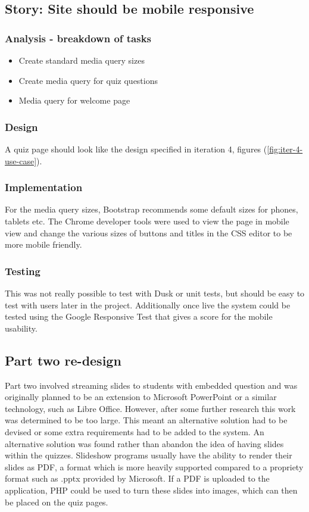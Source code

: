 \subsection{Story: Site should be mobile responsive}
\subsubsection{Analysis - breakdown of tasks}
\begin{itemize}
	\item Create standard media query sizes
	\item Create media query for quiz questions
	\item Media query for welcome page
\end{itemize}
\subsubsection{Design}
A quiz page should look like the design specified in iteration 4, figures (\ref{fig:iter-4-use-case}).
\subsubsection{Implementation}
For the media query sizes, Bootstrap recommends some default sizes for phones, tablets etc\cite{bootstrap-media-queries}. The Chrome developer tools were used to view the page in mobile view and change the various sizes of buttons and titles in the CSS editor to be more mobile friendly.
\subsubsection{Testing}
This was not really possible to test with Dusk or unit tests, but should be easy to test with users later in the project. Additionally once live the system could be tested using the Google Responsive Test that gives a score for the mobile usability.
\newpage

\subsection{Part two re-design}
Part two involved streaming slides to students with embedded question and was originally planned to be an extension to Microsoft PowerPoint or a similar technology, such as Libre Office. However, after some further research this work was determined to be too large. This meant an alternative solution had to be devised or some extra requirements had to be added to the system. An alternative solution was found rather than abandon the idea of having slides within the quizzes. Slideshow programs usually have the ability to render their slides as PDF, a format which is more heavily supported compared to a propriety format such as .pptx provided by Microsoft. If a PDF is uploaded to the application, PHP could be used to turn these slides into images, which can then be placed on the quiz pages.


